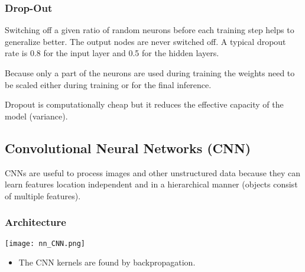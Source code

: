 \subsubsection{Drop-Out}

Switching off a given ratio of random neurons before each training step helps to generalize better. The output nodes are never switched off. A typical dropout rate is 0.8 for the input layer and 0.5 for the hidden layers.

\newpar{}

Because only a part of the neurons are used during training the weights need to be scaled either during training or for the final inference.


\newpar{}
Dropout is computationally cheap but it reduces the effective capacity of the model (variance).

\subsection{Convolutional Neural Networks (CNN)}

CNNs are useful to process images and other unstructured data because they can learn features location independent and in a hierarchical manner (objects consist of multiple features).
\newpar{}

\subsubsection{Architecture}
\begin{center}
    \texttt{[image: nn\_CNN.png]}
\end{center}
\newpar{}
\begin{itemize}
    \item The CNN kernels are found by backpropagation.
\end{itemize}


